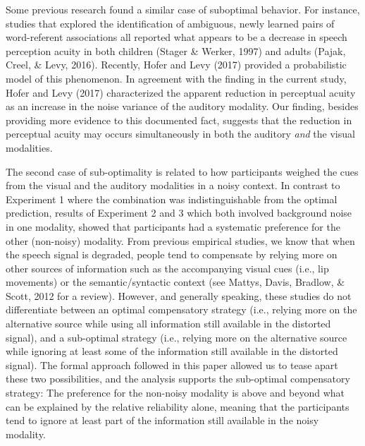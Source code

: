 \documentclass[english,floatsintext,man]{apa6}
\theoremstyle{definition}
\theoremstyle{definition}
\theoremstyle{definition}
\theoremstyle{remark}
\begin{document}
Some previous research found a similar case of suboptimal behavior. For
instance, studies that explored the identification of ambiguous, newly
learned pairs of word-referent associations all reported what appears to
be a decrease in speech perception acuity in both children (Stager \&
Werker, 1997) and adults (Pajak, Creel, \& Levy, 2016). Recently, Hofer
and Levy (2017) provided a probabilistic model of this phenomenon. In
agreement with the finding in the current study, Hofer and Levy (2017)
characterized the apparent reduction in perceptual acuity as an increase
in the noise variance of the auditory modality. Our finding, besides
providing more evidence to this documented fact, suggests that the
reduction in perceptual acuity may occurs simultaneously in both the
auditory \emph{and} the visual modalities.

The second case of sub-optimality is related to how participants weighed
the cues from the visual and the auditory modalities in a noisy context.
In contrast to Experiment 1 where the combination was indistinguishable
from the optimal prediction, results of Experiment 2 and 3 which both
involved background noise in one modality, showed that participants had
a systematic preference for the other (non-noisy) modality. From
previous empirical studies, we know that when the speech signal is
degraded, people tend to compensate by relying more on other sources of
information such as the accompanying visual cues (i.e., lip movements)
or the semantic/syntactic context (see Mattys, Davis, Bradlow, \& Scott,
2012 for a review). However, and generally speaking, these studies do
not differentiate between an optimal compensatory strategy (i.e.,
relying more on the alternative source while using all information still
available in the distorted signal), and a sub-optimal strategy (i.e.,
relying more on the alternative source while ignoring at least some of
the information still available in the distorted signal). The formal
approach followed in this paper allowed us to tease apart these two
possibilities, and the analysis supports the sub-optimal compensatory
strategy: The preference for the non-noisy modality is above and beyond
what can be explained by the relative reliability alone, meaning that
the participants tend to ignore at least part of the information still
available in the noisy modality.
\end{document}
